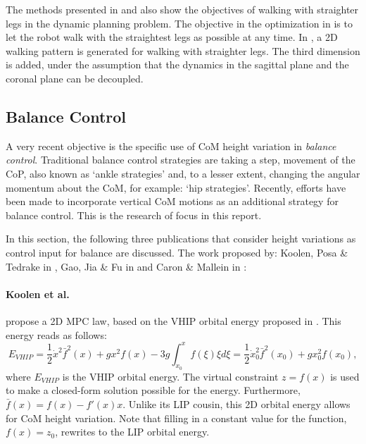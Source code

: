 The methods presented in \cite{brasseur2015robust} and \cite{kajita2017biped} also show the objectives of walking with straighter legs in the dynamic planning problem. The objective in the optimization in \cite{brasseur2015robust} is to let the robot walk with the straightest legs as possible at any time. In \cite{kajita2017biped}, a \ac{2D} walking pattern is generated for walking with straighter legs. The third dimension is added, under the assumption that the dynamics in the sagittal plane and the coronal plane can be decoupled. 
\subsection{Balance Control}\label{subsec:heightbalance}
A very recent objective is the specific use of \ac{CoM} height variation in \textit{balance control}. Traditional balance control strategies are taking a step, movement of the \ac{CoP}, also known as `ankle strategies' and, to a lesser extent, changing the angular momentum about the \ac{CoM}, for example: `hip strategies'. Recently, efforts have been made to incorporate vertical \ac{CoM} motions as an additional strategy for balance control. This is the research of focus in this report.

In this section, the following three publications that consider height variations as control input for balance are discussed. The work proposed by: Koolen, Posa \& Tedrake in \cite{koolen2016balance},  Gao, Jia \& Fu in \cite{gao2017increase} and  Caron \& Mallein in \cite{caron2018balance}:

\paragraph{Koolen et al.} propose a \ac{2D} \ac{MPC} law, based on the \ac{VHIP} orbital energy proposed in \cite{pratt2007derivation}. This energy reads as follows:
\begin{equation}\label{eq:evhip}
    E_{VHIP}  = \frac{1}{2}\dot{x}^2\bar{f}^2(x)+gx^2f(x) - 3g\int_{x_0}^xf(\xi)\xi d\xi = \frac{1}{2}\dot{x}_0^2\bar{f}^2(x_0)+gx_0^2f(x_0),
\end{equation}
where $E_{VHIP}$ is the \ac{VHIP} orbital energy. The virtual constraint $z=f(x)$ is used to make a closed-form solution possible for the energy. Furthermore, $\bar{f}(x)=f(x)-f'(x)x$. Unlike its \ac{LIP} cousin, this \ac{2D} orbital energy allows for \ac{CoM} height variation. Note that filling in a constant value for the function, $f(x)=z_0$, rewrites to the \ac{LIP} orbital energy.

